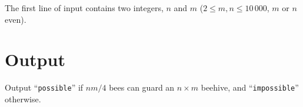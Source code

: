 The first line of input contains two integers, $n$ and $m$ ($2 \leq m,n \leq 10\,000$, $m$ or $n$ even).

\section*{Output}

Output ``\texttt{possible}'' if $nm/4$ bees can guard an
$n \times m$ beehive, and ``\texttt{impossible}'' otherwise.

